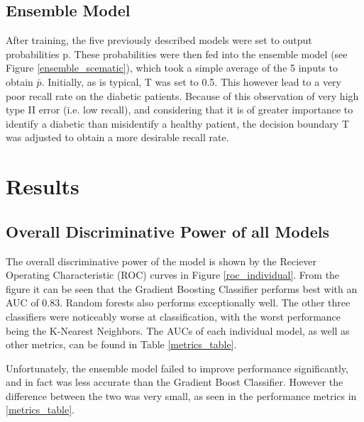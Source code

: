 \documentclass{article} %
\begin{document}
\subsection{Ensemble Model}
After training, the five previously described models were set to output probabilities p. These probabilities were then fed into the ensemble model (see Figure \ref{ensemble_scematic}), which took a simple average of the 5 inputs to obtain $\bar{p}$. Initially, as is typical, T was set to 0.5. This however lead to a very poor recall rate on the diabetic patients. Because of this observation of very high type II error (i.e. low recall), and considering that it is of greater importance to identify a diabetic than misidentify a healthy patient, the decision boundary T was adjusted to obtain a more desirable recall rate.

\section{Results}

\subsection{Overall Discriminative Power of all Models}
The overall discriminative power of the model is shown by the Reciever Operating Characteristic (ROC) curves in Figure \ref{roc_individual}. From the figure it can be seen that the Gradient Boosting Classifier performs best with an AUC of 0.83. Random forests also performs exceptionally well. The other three classifiers were noticeably worse at classification, with the worst performance being the K-Nearest Neighbors. The AUCs of each individual model, as well as other metrics, can be found in Table \ref{metrics_table}. 

Unfortunately, the ensemble model failed to improve performance significantly, and in fact was less accurate than the Gradient Boost Classifier. However the difference between the two was very small, as seen in the performance metrics in \ref{metrics_table}. 
\end{document}
